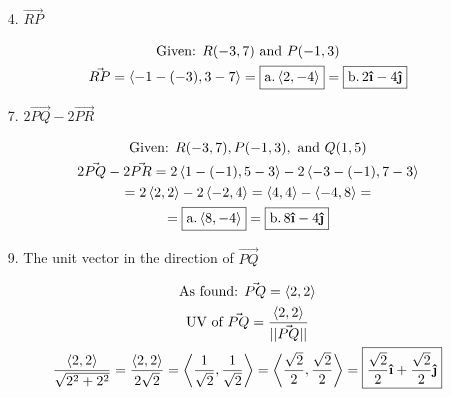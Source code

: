 \documentclass[10pt, letterpaper]{article}
\begin{document}
    \begin{itemize}
        \item [4.] $\vec{RP}$ \\
        
        \begin{mdframed}
            \begin{equation*}
                \begin{gathered}
                    \text{Given: } R(-3,7) \text{ and } P(-1, 3)                \\
                    \vec{RP} =  \expval{-1 - (-3), 3 - 7} = \boxed{\text{a.} \expval{2, -4}} =
                                \boxed{\text{b.}\, 2 \ihat - 4 \jhat}
                \end{gathered}
            \end{equation*}
        \end{mdframed}
        
        \item [7.] $2\vec{PQ} - 2\vec{PR}$ \\

        \begin{mdframed}
            \begin{equation*}
                \begin{gathered}
                    \text{Given: } R(-3,7), P(-1, 3), \text{ and } Q(1, 5)  \\
                    2\vec{PQ} - 2\vec{PR} = 
                    2\expval{1 - (-1), 5 - 3} - 2\expval{-3 - (-1), 7 - 3}  \\
                    = 2\expval{2, 2} - 2\expval{-2, 4} = 
                    \expval{4, 4} - \expval{-4, 8}  =                       \\
                    = \boxed{\text{a.} \expval{8, -4}} = \boxed{\text{b.}\, 8\ihat - 4\jhat}
                \end{gathered}
            \end{equation*}
        \end{mdframed}

        \item [9.] The unit vector in the direction of $\vec{PQ}$ \\
        
        \begin{mdframed}
            \begin{equation*}
                \begin{gathered}
                    \text{As found: } \vec{PQ} = \expval{2, 2}                  \\
                    \text{UV of } \vec{PQ} = \frac{\expval{2, 2}}{||\vec{PQ}||} \\
                    \frac{\expval{2, 2}}{\sqrt{2^2 + 2^2}} 
                    = \frac{\expval{2, 2}}{2\sqrt{2}}
                    = \expval{\frac{1}{\sqrt{2}}, \frac{1}{\sqrt{2}}}
                    = \expval{\frac{\sqrt{2}}{2}, \frac{\sqrt{2}}{2}}
                    = \boxed{\frac{\sqrt{2}}{2}\ihat + \frac{\sqrt{2}}{2}\jhat}
                \end{gathered}
            \end{equation*}
        \end{mdframed}


\end{itemize}
\end{document}
